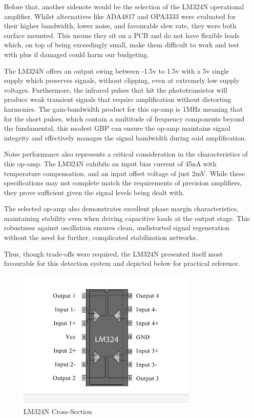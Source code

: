 Before that, another sidenote would be the selection of the LM324N operational amplifier. Whilst alternatives like ADA4817 and OPA3333 were evaluated for their higher bandwidth, lower noise, and favourable slew rate, they were both surface mounted. This means they sit on a PCB and do not have flexible leads which, on top of being exceedingly small, make them difficult to work and test with plus if damaged could harm our budgeting.

The LM324N offers an output swing between -1.5v to 1.5v with a 5v single supply which preserves signals, without clipping, even at extremely low supply voltages. Furthermore, the infrared pulses that hit the phototransistor will produce weak transient signals that require amplification without distorting harmonies. The gain-bandwidth product for this op-amp is 1MHz meaning that for the short pulses, which contain a multitude of frequency components beyond the fundamental, this modest GBP can ensure the op-amp maintains signal integrity and effectively manages the signal bandwidth during said amplification.

Noise performance also represents a critical consideration in the characteristics of this op-amp. The LM324N exhibits an input bias current of 45nA with temperature compensation, and an input offset voltage of just 2mV. While these specifications may not complete match the requirements of precision amplifiers, they prove sufficient given the signal levels being dealt with.

The selected op-amp also demonstrates excellent phase margin characteristics, maintaining stability even when driving capacitive loads at the output stage. This robustness against oscillation ensures clean, undistorted signal regeneration without the need for further, complicated stabilization networks.

Thus, though trade-offs were required, the LM324N presented itself most favourable for this detection system and depicted below for practical reference.

\begin{figure}[H]
    \centering
    \includegraphics[width=0.8\textwidth]{subpages/images/lm324n.png}
    \caption{LM324N Cross-Section}
    \label{fig:lm324n}
\end{figure}

